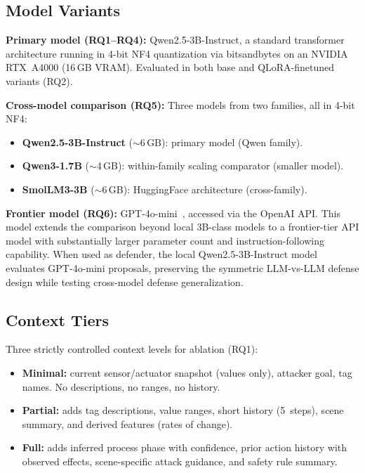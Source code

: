\subsection{Model Variants}
\textbf{Primary model (RQ1--RQ4):} Qwen2.5-3B-Instruct, a standard transformer architecture running in 4-bit NF4 quantization via bitsandbytes on an NVIDIA RTX~A4000 (16\,GB VRAM). Evaluated in both base and QLoRA-finetuned variants (RQ2).

\textbf{Cross-model comparison (RQ5):} Three models from two families, all in 4-bit NF4:
\begin{itemize}[leftmargin=1.2em,nosep]
    \item \textbf{Qwen2.5-3B-Instruct} (${\sim}$6\,GB): primary model (Qwen family).
    \item \textbf{Qwen3-1.7B} (${\sim}$4\,GB): within-family scaling comparator (smaller model).
    \item \textbf{SmolLM3-3B} (${\sim}$6\,GB): HuggingFace architecture (cross-family).
\end{itemize}

\textbf{Frontier model (RQ6):} GPT-4o-mini~\cite{openai2024gpt4omini}, accessed via the OpenAI API. This model extends the comparison beyond local 3B-class models to a frontier-tier API model with substantially larger parameter count and instruction-following capability. When used as defender, the local Qwen2.5-3B-Instruct model evaluates GPT-4o-mini proposals, preserving the symmetric LLM-vs-LLM defense design while testing cross-model defense generalization.

\subsection{Context Tiers}
Three strictly controlled context levels for ablation (RQ1):
\begin{itemize}[leftmargin=1.2em]
    \item \textbf{Minimal:} current sensor/actuator snapshot (values only), attacker goal, tag names. No descriptions, no ranges, no history.
    \item \textbf{Partial:} adds tag descriptions, value ranges, short history (5~steps), scene summary, and derived features (rates of change).
    \item \textbf{Full:} adds inferred process phase with confidence, prior action history with observed effects, scene-specific attack guidance, and safety rule summary.
\end{itemize}


